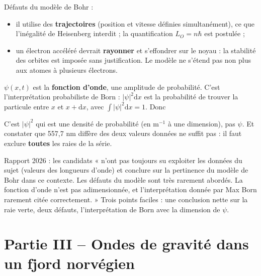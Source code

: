 \documentclass[11pt,a4paper]{article}
\providecommand{\tightlist}{\setlength{\itemsep}{0pt}\setlength{\parskip}{0pt}}
\newcommand{\equationajustee}[1]{%
  \sbox{\boiteequation}{$\displaystyle #1$}%
  \ifdim\wd\boiteequation>\linewidth
    \[\resizebox{\linewidth}{!}{\usebox{\boiteequation}}\]%
  \else
    \[#1\]%
  \fi}
\begin{document}
Défauts du modèle de Bohr :

\begin{itemize}
\tightlist
\item
  il utilise des \textbf{trajectoires} (position et vitesse définies simultanément), ce que l'inégalité de Heisenberg interdit ; la quantification \(L_O=n\hbar\) est postulée ;
\item
  un électron accéléré devrait \textbf{rayonner} et s'effondrer sur le noyau : la stabilité des orbites est imposée sans justification. Le modèle ne s'étend pas non plus aux atomes à plusieurs électrons.
\end{itemize}

\(\psi(x,t)\) est la \textbf{fonction d'onde}, une amplitude de probabilité. C'est l'interprétation probabiliste de Born : \(\lvert\psi\rvert^2\mathrm dx\) est la probabilité de trouver la particule entre \(x\) et \(x+\mathrm dx\), avec \(\int\lvert\psi\rvert^2\mathrm dx=1\). Donc

\equationajustee{\boxed{[\psi]=\mathrm m^{-1/2}}}

\begin{piege}

C'est \(\lvert\psi\rvert^2\) qui est une densité de probabilité (en \(\mathrm m^{-1}\) à une dimension), pas \(\psi\). Et constater que 557,7 nm diffère des deux valeurs données ne suffit pas : il faut exclure \textbf{toutes} les raies de la série.

\end{piege}

\begin{jury}

Rapport 2026 : les candidats « n'ont pas toujours su exploiter les données du sujet (valeurs des longueurs d'onde) et conclure sur la pertinence du modèle de Bohr dans ce contexte. Les défauts du modèle sont très rarement abordés. La fonction d'onde n'est pas adimensionnée, et l'interprétation donnée par Max Born rarement citée correctement. » Trois points faciles : une conclusion nette sur la raie verte, deux défauts, l'interprétation de Born avec la dimension de \(\psi\).

\end{jury}

\hypertarget{partie-iii-ondes-de-gravituxe9-dans-un-fjord-norvuxe9gien}{%
\section{Partie III -- Ondes de gravité dans un fjord norvégien}\label{partie-iii-ondes-de-gravituxe9-dans-un-fjord-norvuxe9gien}}
\end{document}
